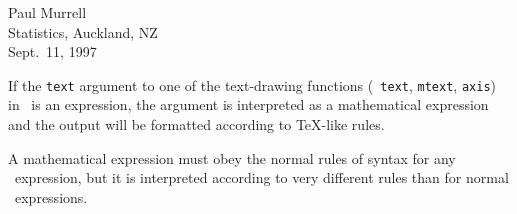 
\begin{center}\Large
Paul Murrell \\ 
Statistics, Auckland, NZ \\[2\parskip]
{Sept.~11, 1997}
\end{center}

If the {\tt text} argument to one of the text-drawing functions ({\tt
text}, {\tt mtext}, {\tt axis}) in \R\ is an expression, the argument
is interpreted as a mathematical expression and the output will be
formatted according to \TeX -like rules.

A mathematical expression must obey the normal rules of syntax for
any \R\ expression, but it is interpreted according to very
different rules than for normal \R\ expressions.

